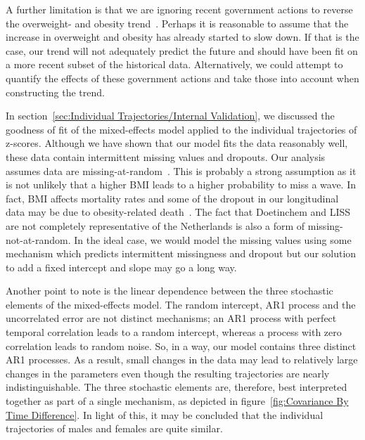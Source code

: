 \documentclass{imammb}
\numberwithin{equation}{section}
\begin{document}
A further limitation is that we are ignoring recent government actions to reverse the overweight- and obesity trend~\citep{VWS2018, VanRinsum2018}. Perhaps it is reasonable to assume that the increase in overweight and obesity has already started to slow down. If that is the case, our trend will not adequately predict the future and should have been fit on a more recent subset of the historical data. Alternatively, we could attempt to quantify the effects of these government actions and take those into account when constructing the trend.

In section~\ref{sec:Individual Trajectories/Internal Validation}, we discussed the goodness of fit of the mixed-effects model applied to the \mbox{individual} trajectories of z-scores. Although we have shown that our model fits the data reasonably well, these data contain intermittent missing values and dropouts. Our analysis assumes data are missing-at-random~\citep{Diggle1994, Verbeke2000}. This is probably a strong assumption as it is not unlikely that a higher BMI leads to a higher probability to miss a wave. In fact, BMI \mbox{affects} mortality rates and some of the dropout in our longitudinal data may be due to obesity-related death~\citep{Hoogenveen2000}. The fact that Doetinchem and LISS are not completely representative of the Netherlands is also a form of missing-not-at-random. In the ideal case, we would model the missing values using some mechanism which predicts intermittent missingness and dropout but our solution to add a fixed intercept and slope may go a long way.

Another point to note is the linear dependence between the three stochastic elements of the mixed-effects model. The random intercept, AR1 process and the uncorrelated error are not distinct mechanisms; an AR1 process with perfect temporal correlation leads to a random intercept, whereas a process with zero correlation leads to random noise. So, in a way, our model contains three distinct AR1 processes. As a result, small changes in the data may lead to relatively large changes in the parameters even though the resulting trajectories are nearly indistinguishable. The three stochastic elements are, therefore, best interpreted together as part of a single mechanism, as depicted in figure~\ref{fig:Covariance By Time Difference}. In light of this, it may be concluded that the individual trajectories of males and females are quite similar.
\end{document}
